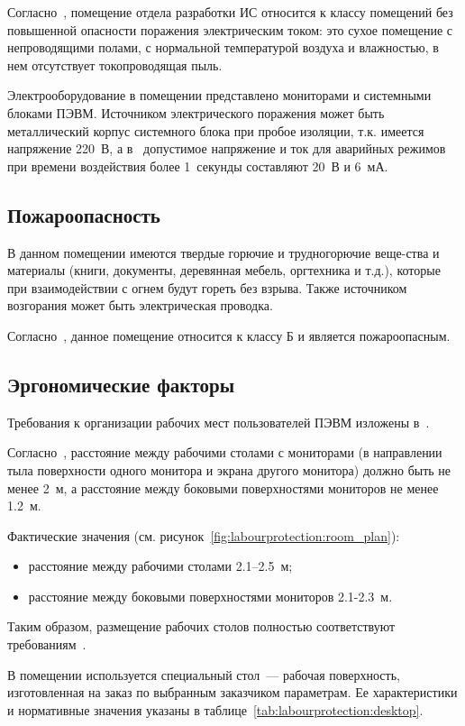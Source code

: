 Согласно~\cite{PUE7}, помещение отдела разработки ИС относится к классу помещений без повышенной опасности поражения электрическим током: это сухое помещение с непроводящими полами, с нормальной температурой воздуха и влажностью, в нем отсутствует токопроводящая пыль.

Электрооборудование в помещении представлено мониторами и системными блоками ПЭВМ. Источником электрического поражения может быть металлический корпус системного блока при пробое изоляции, т.к. имеется напряжение 220~В, а в~\cite{GOST12_1_038} допустимое напряжение и ток для аварийных режимов при времени воздействия более 1~секунды составляют 20~В и 6~мА.

\subsection{Пожароопасность}
В данном помещении имеются твердые горючие и  трудногорючие веще-ства и материалы (книги, документы, деревянная мебель, оргтехника и т.д.), которые при взаимодействии с огнем будут гореть без взрыва. Также источником возгорания может быть электрическая проводка.

Согласно~\cite{GOST12_1_004}, данное помещение относится к классу Б и является пожароопасным.

\subsection{Эргономические факторы}
Требования к организации рабочих мест пользователей ПЭВМ изложены в~\cite{SanPin2_2_2}. 

Согласно~\cite{SanPin2_2_2}, расстояние между рабочими столами с мониторами (в направлении тыла поверхности одного монитора и экрана другого монитора) должно быть не менее 2~м, а расстояние между боковыми поверхностями мониторов не менее 1.2~м.

Фактические значения (см. рисунок~\ref{fig:labourprotection:room_plan}):
\begin{itemize}
	\item расстояние между рабочими столами 2.1--2.5~м;
	\item расстояние между боковыми поверхностями мониторов 2.1-2.3~м.
\end{itemize}

Таким образом, размещение рабочих столов полностью соответствуют требованиям~\cite{SanPin2_2_2}.

В помещении используется специальный стол~--– рабочая поверхность, изготовленная на заказ по выбранным заказчиком параметрам. Ее характеристики и нормативные значения указаны в таблице~\ref{tab:labourprotection:desktop}.

